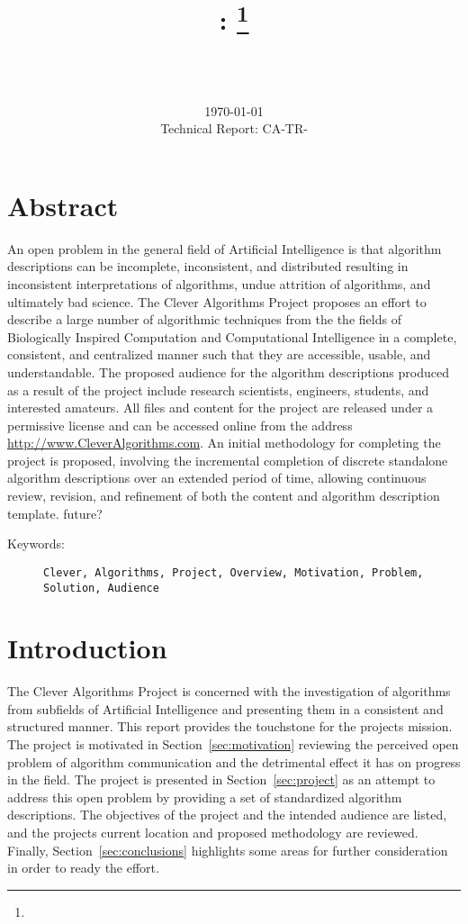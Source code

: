 \documentclass[a4paper, 11pt]{article}
\title{{\myreporttitle}: {\myreportsubtitle}\footnote{\myreportlicense}}
\author{\myreportname\\\small\myreportemail\\\myreportproject}
\date{\today\\Technical Report: CA-TR-\myreportdate}
\begin{document}
\maketitle

\section*{Abstract} 
An open problem in the general field of Artificial Intelligence is that algorithm descriptions can be incomplete, inconsistent, and distributed resulting in inconsistent interpretations of algorithms, undue attrition of algorithms, and ultimately bad science. 
The Clever Algorithms Project proposes an effort to describe a large number of algorithmic techniques from the the fields of Biologically Inspired Computation and Computational Intelligence in a complete, consistent, and centralized manner such that they are accessible, usable, and understandable. 
The proposed audience for the algorithm descriptions produced as a result of the project include research scientists, engineers, students, and interested amateurs.
All files and content for the project are released under a permissive license and can be accessed online from the address \url{http://www.CleverAlgorithms.com}.
An initial methodology for completing the project is proposed, involving the incremental completion of discrete standalone algorithm descriptions over an extended period of time, allowing continuous review, revision, and refinement of both the content and algorithm description template.
future?
\begin{description}
	\item[Keywords:] {\small\texttt{Clever, Algorithms, Project, Overview, Motivation, Problem, Solution, Audience}}
\end{description} 

\section{Introduction}
\label{sec:introduction}
The Clever Algorithms Project is concerned with the investigation of algorithms from subfields of Artificial Intelligence and presenting them in a consistent and structured manner. This report provides the touchstone for the projects mission.
The project is motivated in Section~\ref{sec:motivation} reviewing the perceived open problem of algorithm communication and the detrimental effect it has on progress in the field. The project is presented in Section~\ref{sec:project} as an attempt to address this open problem by providing a set of standardized algorithm descriptions. The objectives of the project and the intended audience are listed, and the projects current location and proposed methodology are reviewed. Finally, Section~\ref{sec:conclusions} highlights some areas for further consideration in order to ready the effort.
\end{document}
